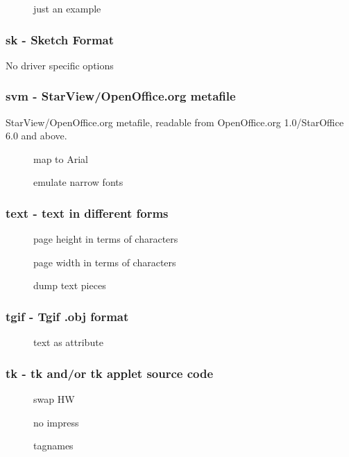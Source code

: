 \documentclass[english,a4paper]{article}
\begin{document}
\begin{description}
\item[] 
just an example


\end{description}
\subsubsection{sk - Sketch Format}
No driver specific options
\subsubsection{svm - StarView/OpenOffice.org metafile}
StarView/OpenOffice.org metafile, readable from OpenOffice.org 1.0/StarOffice 6.0 and above.

\begin{description}
\item[] 
map to Arial


\item[] 
emulate narrow fonts


\end{description}
\subsubsection{text - text in different forms }
\begin{description}
\item[] 
page height in terms of characters


\item[] 
page width in terms of characters


\item[] 
dump text pieces


\end{description}
\subsubsection{tgif - Tgif .obj format}
\begin{description}
\item[] 
text as attribute


\end{description}
\subsubsection{tk - tk and/or tk applet source code}
\begin{description}
\item[] 
swap HW


\item[] 
no impress


\item[] 
tagnames


\end{description}
\end{document}
